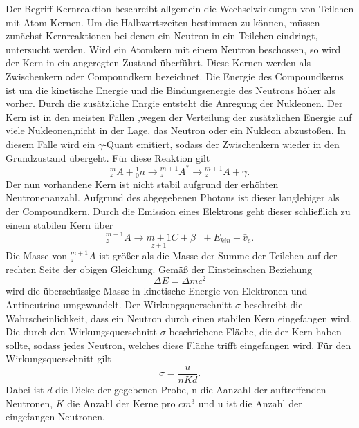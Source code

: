 Der Begriff Kernreaktion beschreibt allgemein die Wechselwirkungen von Teilchen mit Atom Kernen.
Um die Halbwertszeiten bestimmen zu können, müssen zunächst Kernreaktionen bei denen ein Neutron in ein Teilchen
eindringt, untersucht werden. Wird ein Atomkern mit einem Neutron beschossen, so wird der Kern in ein angeregten Zustand überführt.
Diese Kernen werden als Zwischenkern oder Compoundkern bezeichnet.
Die Energie des Compoundkerns ist um die kinetische Energie und die Bindungsenergie des Neutrons höher als
vorher. Durch die zusätzliche Enrgie entsteht die Anregung der Nukleonen. Der Kern ist in den meisten Fällen ,wegen der
Verteilung der zusätzlichen Energie auf viele Nukleonen,nicht in der Lage, das Neutron oder ein Nukleon abzustoßen.
In diesem Falle wird ein $\gamma$-Quant emitiert, sodass der Zwischenkern wieder in den Grundzustand übergeht.
Für diese Reaktion gilt
\begin{equation}
    { }_z^m A+{ }_0^1 n \rightarrow{ }_z^{m+1} A^* \rightarrow{ }_z^{m+1} A+\gamma .
    \label{eqn:vorher}
\end{equation}
Der nun vorhandene Kern ist nicht stabil aufgrund der erhöhten Neutronenanzahl. Aufgrund des abgegebenen
Photons ist dieser langlebiger als der Compoundkern. Durch die Emission eines Elektrons geht dieser schließlich zu einem 
stabilen Kern über
\begin{equation}
    { }_z^{m+1} A \rightarrow \underset{z+1}{m+1} C+\beta^{-}+E_{k i n}+\bar{v}_e .
    \label{eqn:stabil}
\end{equation}
Die Masse von ${ }_z^{m+1} A$ ist größer als die Masse der Summe der Teilchen auf der rechten Seite der obigen Gleichung.
Gemäß der Einsteinschen Beziehung 
\begin{equation*}
    \Delta E = \Delta m c^2
\end{equation*}
wird die überschüssige Masse in kinetische Energie von Elektronen und Antineutrino umgewandelt.
Der Wirkungsquerschnitt $\sigma$ beschreibt die Wahrscheinlichkeit, dass ein Neutron durch einen stabilen Kern
eingefangen wird. Die durch den Wirkungsquerschnitt $\sigma$ beschriebene Fläche, die der Kern haben sollte,
sodass jedes Neutron, welches diese Fläche trifft eingefangen wird. Für den Wirkungsquerschnitt gilt
\begin{equation}
    \sigma = \frac{u}{nKd}.
    \label{eqn:wirkungs}
\end{equation}
Dabei ist $d$ die Dicke der gegebenen Probe, n die Aanzahl der auftreffenden Neutronen, $K$ die Anzahl der Kerne pro $\si{cm}^3$
und u ist die Anzahl der eingefangen Neutronen.

